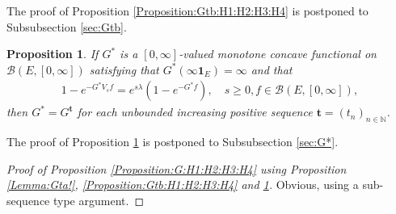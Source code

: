 \documentclass[12pt,a4paper]{amsart}
\numberwithin{equation}{section}
\theoremstyle{plain}
\newtheorem{prop}[thm]{Proposition}
\theoremstyle{definition}
\theoremstyle{remark}
\newcounter{N}
\newcounter{n}[N]
\begin{document}
The proof of Proposition \ref{Proposition:Gtb:H1:H2:H3:H4} is postponed to Subsubsection \ref{sec:Gtb}. 

\begin{prop} \label{Proposition:G*:H1:H2:H3:H4} 
If $G^*$ is a $[0,\infty]$-valued monotone concave functional on $\mathcal B(E,[0,\infty])$ satisfying that $G^*(\infty \mathbf 1_E) = \infty$ and that
\begin{align}
 1 - e^{-G^* V_s f} 
 = e^{s\lambda} (1 - e^{- G^* f}),
 \quad s\geq 0, f\in \mathcal B(E,[0,\infty]),
 \end{align}
then $G^* = G^\mathbf t$ for each unbounded increasing positive sequence $\mathbf t = (t_n)_{n\in \mathbb N}$.
\end{prop}

The proof of Proposition \ref{Proposition:G*:H1:H2:H3:H4} is postponed to Subsubsection \ref{sec:G*}.

\begin{proof}[Proof of Proposition \ref{Proposition:G:H1:H2:H3:H4} using Proposition \ref{Lemma:Gta!}, \ref{Proposition:Gtb:H1:H2:H3:H4} and \ref{Proposition:G*:H1:H2:H3:H4}]
Obvious, using a sub-sequence type argument.
\end{proof}
\end{document}
